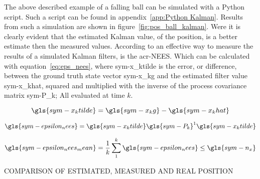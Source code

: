 The above described example of a falling ball can be simulated with a Python script. Such a script can be found in
appendix~\ref{app:Python Kalman}. Results from such a simulation are shown in figure~\ref{fig:pos_ball_kalman}. Were it
is clearly evident that the estimated Kalman value, of the position, is a better estimate then the measured values.
According to \citet{roger_r_labbe_jr_kalman_2017} an effective way to measure the results of a simulated Kalman filters,
is the \gls{acr-NEES}. Which can be calculated with equation~\ref{eq:eps_nees}, where \gls{sym-x_ktilde} is the
error, or difference, between the ground truth state vector \gls{sym-x_kg} and the estimated filter value
\gls{sym-x_khat}, squared and multiplied with the inverse of the process covariance matrix \gls{sym-P_k}; All evaluated
at time \( k \).

\begin{equation}
    \label{eq:xtild}
    \gls{sym-x_ktilde} = \gls{sym-x_kg} - \gls{sym-x_khat}
\end{equation}

\begin{equation}
    \label{eq:eps_nees}
    \gls{sym-epsilon_nees} = \gls{sym-x_ktilde} \gls{sym-P_k}^1 \gls{sym-x_ktilde}
\end{equation}

\begin{equation}
    \label{eq:mean_eps}
    \gls{sym-epsilon_nees_mean} = \frac{1}{k}\sum_{1}^{k} \gls{sym-epsilon_nees} \leq \gls{sym-n_x}
\end{equation}

\begin{RoyalFigure}[!htb, label=fig:pos_ball_kalman]{COMPARISON OF ESTIMATED, MEASURED AND REAL POSITION}
\end{RoyalFigure}


